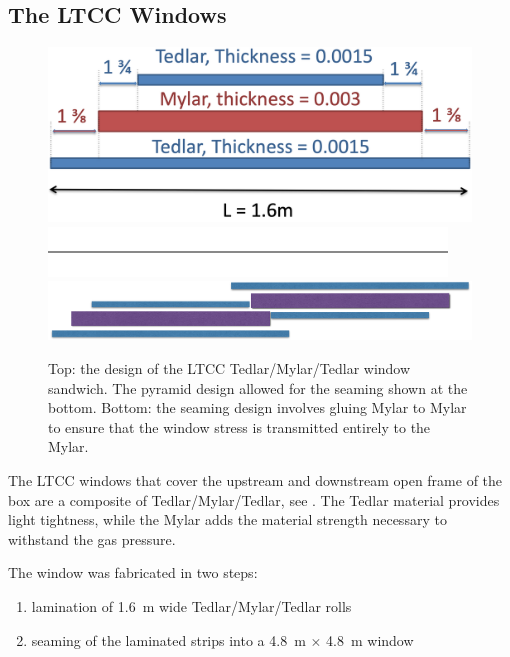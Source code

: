 \subsection{The LTCC Windows}


\begin{figure}[!ht]
	\centering
	\includegraphics[width=0.98\columnwidth, keepaspectratio]{img/windowDesign.png}
	\includegraphics[width=0.98\columnwidth, keepaspectratio]{img/blank.png}
	\includegraphics[width=0.98\columnwidth, keepaspectratio]{img/windowSeaming.png}
	\caption{Top: the design of the LTCC Tedlar/Mylar/Tedlar window sandwich. The pyramid design allowed for the
          seaming shown at the bottom. Bottom: the seaming design involves gluing Mylar to Mylar to ensure that the window
          stress is transmitted entirely to the Mylar.}
	\label{fig:windowDesign}
\end{figure}

The LTCC windows that cover the upstream and downstream open frame of the box are a composite of
Tedlar/Mylar/Tedlar, see . The Tedlar material provides light tightness, while the Mylar adds the
material strength necessary to withstand the gas pressure.

The window was fabricated in two steps:

\begin{enumerate}
	\item lamination of 1.6~m wide Tedlar/Mylar/Tedlar rolls
	\item seaming of the laminated strips into a 4.8~m $\times$ 4.8~m window
\end{enumerate}

